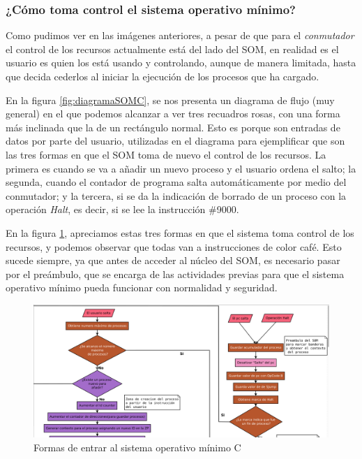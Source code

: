 \documentclass[letterpaper,12pt,oneside]{book}
\begin{document}
		
		\subsubsection{¿Cómo toma control el sistema operativo mínimo?}
		
		Como pudimos ver en las imágenes anteriores, a pesar de que para el \textit{conmutador} el control de los recursos actualmente está del lado
		del SOM, en realidad es el usuario es quien los está usando y controlando, aunque de manera limitada, hasta que decida cederlos al iniciar la 
		ejecución de los procesos que ha cargado. 
  
        En la figura \ref{fig:diagramaSOMC}, se nos presenta un diagrama de flujo (muy general) en el que podemos alcanzar a ver tres recuadros
		rosas, con una forma más inclinada que la de un rectángulo normal. Esto es porque son entradas de datos por parte del usuario, utilizadas en el 
		diagrama para ejemplificar que son las tres formas en que el SOM toma de nuevo el control de los recursos. La primera es cuando
		se va a añadir un nuevo proceso y el usuario ordena el salto; la segunda, cuando el contador de programa salta automáticamente por medio del 
		conmutador; y la tercera,
		si se da la indicación de borrado de un proceso con la operación \textit{Halt}, es decir, si se lee la instrucción \#9000.
		
		
		En la figura \ref{fig:eccSOMCdiagent}, apreciamos estas tres formas en que el sistema toma control de los recursos, y podemos observar que todas 
		van a instrucciones
		de color café. Esto sucede siempre, ya que antes de acceder al núcleo del SOM, es necesario pasar por el preámbulo, que se encarga de 
		las actividades 
		previas	para que el sistema operativo mínimo pueda funcionar con normalidad y seguridad.
		
		
		\begin{figure}[h]		
			\centering
			\includegraphics[scale=0.25]{media/CARDIACC/ecardiaccDiagrama_entradas.png}
			\caption{Formas de entrar al sistema operativo mínimo C}
			\label{fig:eccSOMCdiagent}
		\end{figure}
		
\end{document}
